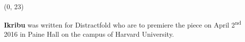 \documentclass[10pt]{article}
\begin{document}
\begin{textblock}{23}(0, 23)

\textbf{Ikribu} was written for Distractfold who are to premiere the piece on
April 2\textsuperscript{nd} 2016 in Paine Hall on the campus of Harvard
University.

\end{textblock}
\end{document}
